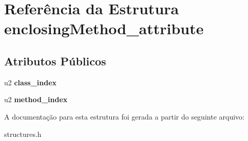 \hypertarget{structenclosingMethod__attribute}{}\section{Referência da Estrutura enclosing\+Method\+\_\+attribute}
\label{structenclosingMethod__attribute}
\subsection*{Atributos Públicos}
\begin{DoxyCompactItemize}
\item 
\mbox{\label{structenclosingMethod__attribute_a3f2ebf2e90b6eb973e3fc92d88307c06}} 
u2 {\bfseries class\+\_\+index}
\item 
\mbox{\label{structenclosingMethod__attribute_a86276273eb87b21a7d0bb23daddb0bca}} 
u2 {\bfseries method\+\_\+index}
\end{DoxyCompactItemize}


A documentação para esta estrutura foi gerada a partir do seguinte arquivo\+:\begin{DoxyCompactItemize}
\item 
structures.\+h\end{DoxyCompactItemize}
